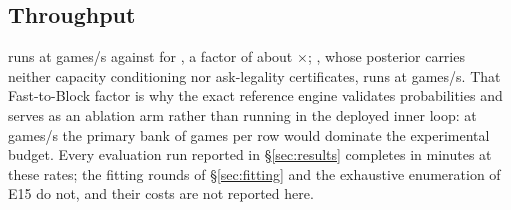 \subsection{Throughput}
\label{sec:throughput}

\begin{table}[!htbp]
\centering
\caption{Whole-game throughput (E9). Population: self-play games under the full
rules dialect with policy weights frozen; the unit is one complete game and the
last column gives how many were timed. The \vfast{} and \vblock{} rows differ
only in the belief path. No intervals; these are wall-clock rates for one timing
run each.}
\label{tab:throughput}
\small

\end{table}

\vfast{} runs at \numThroughputFast{} games/s against \numThroughputBlock{} for
\vblock{}, a factor of about \numThroughputRatio$\times$; \vthree{}, whose
posterior carries neither capacity conditioning nor ask-legality certificates,
runs at \numThroughputThree{} games/s. That Fast-to-Block factor is why the exact
reference engine validates probabilities and serves as an ablation arm rather
than running in the deployed inner loop: at \numThroughputBlock{} games/s the
primary bank of \numHtHGames{} games per row would dominate the experimental
budget. Every evaluation run reported in \S\ref{sec:results} completes in
minutes at these rates; the fitting rounds of \S\ref{sec:fitting} and the
exhaustive enumeration of E15 do not, and their costs are not reported here.

\renewcommand{\topfraction}{0.7}
\renewcommand{\bottomfraction}{0.3}
\renewcommand{\textfraction}{0.2}
\renewcommand{\floatpagefraction}{0.5}
\setcounter{topnumber}{2}
\setcounter{bottomnumber}{1}
\setcounter{totalnumber}{3}
\setlength{\textfloatsep}{20pt plus 2pt minus 4pt}
\setlength{\floatsep}{12pt plus 2pt minus 2pt}
\setlength{\intextsep}{12pt plus 2pt minus 2pt}
